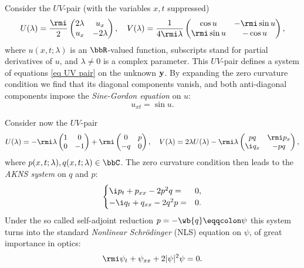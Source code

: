 \begin{example}\label{ex sine-gordon}
    Consider the $UV$-pair (with the variables $x,t$ suppressed)
    \[U(\lambda)=\frac{\rmi}{2}\begin{pmatrix}
        2\lambda & u_x\\
        u_x & -2\lambda
    \end{pmatrix},\quad 
    V(\lambda)=\frac{1}{4\rmi \lambda}\begin{pmatrix}
        \cos u & -\rmi \sin u\\
        \rmi \sin u & -\cos u
    \end{pmatrix},
    \]
    where $u(x,t;\lambda)$ is an $\bbR$-valued function, subscripts stand for partial derivatives of $u$, and $\lambda\neq 0$ is a complex parameter. This $UV$-pair defines a system of equations \eqref{eq UV pair} on the unknown $\bf{y}$. By expanding the zero curvature condition we find that its diagonal components vanish, and both anti-diagonal components impose the \emph{Sine-Gordon equation} on $u$:
    \[u_{xt}=\sin u.\]
\end{example}

\begin{example}
    Consider now the $UV$-pair 
    \[
    U(\lambda)=-\rmi\lambda
    \begin{pmatrix}
        1 & 0\\
        0 & -1
    \end{pmatrix}+\rmi\begin{pmatrix}
        0 & p\\
        -q & 0
    \end{pmatrix},\quad 
    V(\lambda)=
    2\lambda U(\lambda)
    -\rmi\lambda\begin{pmatrix}
        pq & \rmi p_x\\
        \i q_x & -pq
    \end{pmatrix},\label{eq AKNS UV pair}
    \]
    where $p(x,t;\lambda),q(x,t;\lambda)\in\bbC$. The zero curvature condition then leads to the \emph{AKNS system} on $q$ and $p$:
    \[
        \begin{cases}
            \i p_t+p_{xx}-2p^2q= &0,\\
            -\i q_t+q_{xx}-2q^2p= &0.
        \end{cases}    
    \]
    Under the so called self-adjoint reduction $p=-\wb{q}\eqqcolon \psi$ this system turns into the standard \emph{Nonlinear Schr\"odinger} (NLS) equation on $\psi$, of great importance in optics:
    \[\rmi\psi_t+\psi_{xx}+2|\psi|^2\psi=0.\]
\end{example}

